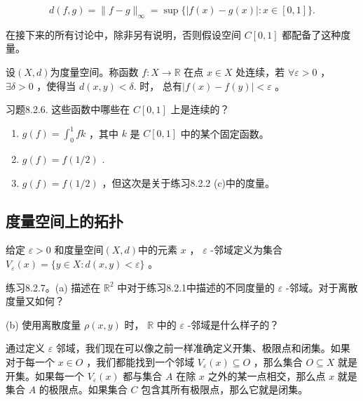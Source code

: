 \[
d\left( {f,g}\right)  = \parallel f - g{\parallel }_{\infty } = \sup \{ \left| {f\left( x\right)  - g\left( x\right) }\right|  : x \in  \left\lbrack  {0,1}\right\rbrack  \} .
\]

在接下来的所有讨论中，除非另有说明，否则假设空间 \(C\left\lbrack  {0,1}\right\rbrack\) 都配备了这种度量。

\begin{Def}
  \label{def:8.2.5}
  设$(X, d)$为度量空间。称函数 \(f : X \rightarrow  \mathbb{R}\) 在点 \(x \in  X\) 处连续，若 \(\forall \varepsilon  > 0\) ， \(\exists \delta  > 0\) ，使得当 \(d\left( {x,y}\right)  < \delta .\) 时， 总有\(\left| {f\left( x\right)  - f\left( y\right) }\right|  < \varepsilon\) 。
\end{Def}


习题8.2.6. 这些函数中哪些在 \(C\left\lbrack  {0,1}\right\rbrack\) 上是连续的？
\begin{enumerate}[label = (\alph*)]
\item  \(g\left( f\right)  = {\int }_{0}^{1}{fk}\) ，其中 \(k\) 是 \(C\left\lbrack  {0,1}\right\rbrack\) 中的某个固定函数。
\item  \(g\left( f\right)  = f\left( {1/2}\right)\) .
\item  \(g\left( f\right)  = f\left( {1/2}\right)\) ，但这次是关于练习8.2.2 (c)中的度量。
\end{enumerate}

\subsection{度量空间上的拓扑}
\begin{Def}
  \label{def:8.2.6}
  给定 \(\varepsilon  > 0\) 和度量空间$(X, d)$中的元素 \(x\) ， \(\varepsilon\) -邻域定义为集合 \({V}_{\varepsilon }\left( x\right)  = \{ y \in  X : d\left( {x,y}\right)  < \varepsilon \}\) 。
\end{Def}


练习8.2.7。(a) 描述在 \({\mathbb{R}}^{2}\) 中对于练习8.2.1中描述的不同度量的 \(\varepsilon\) -邻域。对于离散度量又如何？

(b) 使用离散度量 \(\rho \left( {x,y}\right)\) 时， \(\mathbb{R}\) 中的 \(\varepsilon\) -邻域是什么样子的？

通过定义 \(\varepsilon\) 邻域，我们现在可以像之前一样准确定义开集、极限点和闭集。如果对于每一个 \(x \in  O\) ，我们都能找到一个邻域 \({V}_{\varepsilon }\left( x\right)  \subseteq  O\) ，那么集合 \(O \subseteq  X\) 就是开集。如果每一个 \({V}_{\varepsilon }\left( x\right)\) 都与集合 \(A\) 在除 \(x\) 之外的某一点相交，那么点 \(x\) 就是集合 \(A\) 的极限点。如果集合 \(C\) 包含其所有极限点，那么它就是闭集。

